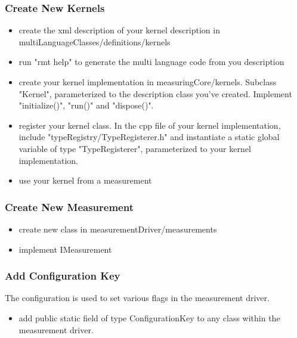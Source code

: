 \documentclass[a4paper,12pt]{article}
\begin{document}
\subsubsection{Create New Kernels}
\begin{itemize}
\item create the xml description of your kernel description in multiLanguageClasses/definitions/kernels
\item run "rmt help" to generate the multi language code from you description
\item create your kernel implementation in measuringCore/kernels. Subclass "Kernel", parameterized to the description class you've created. Implement "initialize()", "run()" and "dispose()".
\item register your kernel class. In the cpp file of your kernel implementation, include "typeRegistry/TypeRegisterer.h" and instantiate a static global variable of type "TypeRegisterer", parameterized to your kernel implementation.
\item use your kernel from a measurement
\end{itemize}

\subsubsection{Create New Measurement}
\begin{itemize}
\item create new class in measurementDriver/measurements
\item implement IMeasurement
\end{itemize}

\subsubsection{Add Configuration Key}
The configuration is used to set various flags in the measurement driver.
\begin{itemize}
\item add public static field of type ConfigurationKey to any class within the measurement driver.
\end{itemize}
\end{document}

